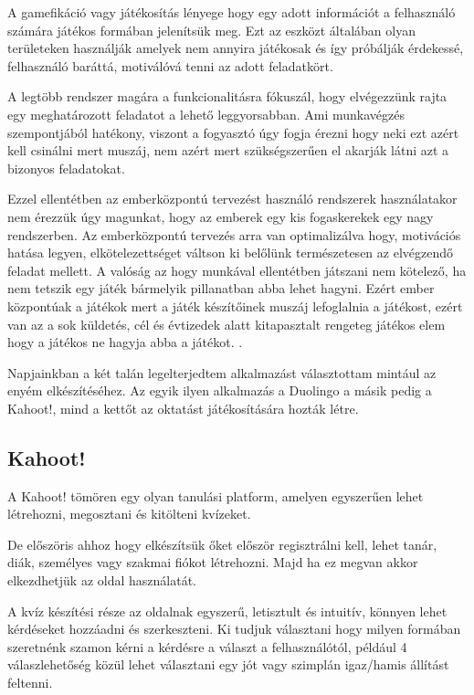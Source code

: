 

A gamefikáció vagy játékosítás lényege hogy egy adott információt a felhasználó számára játékos formában jelenítsük meg. Ezt az eszközt általában olyan területeken használják amelyek nem annyira játékosak és így próbálják érdekessé, felhasználó baráttá, motiválóvá tenni az adott feladatkört.

A legtöbb rendszer magára a funkcionalitásra fókuszál, hogy elvégezzünk rajta egy meghatározott feladatot a lehető leggyorsabban. Ami munkavégzés szempontjából hatékony, viszont a fogyasztó úgy fogja érezni hogy neki ezt azért kell csinálni mert muszáj, nem azért mert szükségszerűen el akarják látni azt a bizonyos feladatokat.

Ezzel ellentétben az emberközpontú tervezést használó rendszerek használatakor nem érezzük úgy magunkat, hogy az emberek egy kis fogaskerekek egy nagy rendszerben. Az emberközpontú tervezés arra van optimalizálva hogy, motivációs hatása legyen, elkötelezettséget váltson ki belőlünk természetesen az elvégzendő feladat mellett. A valóság az hogy munkával ellentétben játszani nem kötelező, ha nem tetszik egy játék bármelyik pillanatban abba lehet hagyni. Ezért ember központúak a játékok mert a játék készítőinek muszáj lefoglalnia a játékost, ezért van az a sok küldetés, cél és évtizedek alatt kitapasztalt rengeteg játékos elem hogy a játékos ne hagyja abba a játékot. \cite{actionablegamification}.


Napjainkban a két talán legelterjedtem alkalmazást választottam mintául az enyém elkészítéséhez. Az egyik ilyen alkalmazás a Duolingo\cite{duolingo} a másik pedig a Kahoot!\cite{kahoot}, mind a kettőt az oktatást játékosítására hozták létre.

\subsection{Kahoot!}

A Kahoot! tömören egy olyan tanulási platform, amelyen egyszerűen lehet létrehozni, megosztani és kitölteni kvízeket.

De előszöris ahhoz hogy elkészítsük őket először regisztrálni kell, lehet tanár, diák, személyes vagy szakmai fiókot létrehozni. Majd ha ez megvan akkor elkezdhetjük az oldal használatát.

A kvíz készítési része az oldalnak egyszerű, letisztult és intuitív, könnyen lehet kérdéseket hozzáadni és szerkeszteni. Ki tudjuk választani hogy milyen formában szeretnénk szamon kérni a kérdésre a választ a felhasználótól, például 4 válaszlehetőség közül lehet választani egy jót vagy szimplán igaz/hamis állítást feltenni.

